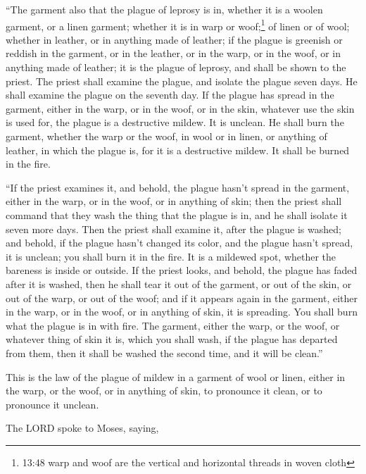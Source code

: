 \myverse{}“The garment also that the plague of leprosy is in, whether
it is a woolen garment, or a linen garment;
\myverse{}whether it is in warp or woof;\footnote{13:48 warp and woof are the vertical and horizontal threads in woven cloth} of linen or of
wool; whether in leather, or in anything made of leather;
\myverse{}if the plague is greenish or reddish in the garment, or in the leather, or
in the warp, or in the woof, or in anything made of leather; it is the plague of leprosy, and shall be
shown to the priest.
\myverse{}The priest shall examine the plague, and isolate the plague seven days.
\myverse{}He shall examine the plague on the seventh day. If the plague has spread
in the garment, either in the warp, or in the woof, or in the skin, whatever use the skin is used for,
the plague is a destructive mildew. It is unclean.
\myverse{}He shall burn the garment, whether the warp or the woof, in wool or in linen,
or anything of leather, in which the plague is, for it is a destructive mildew. It shall be burned in
the fire.


\myverse{}“If the priest examines it, and behold, the plague hasn’t spread
in the garment, either in the warp, or in the woof, or in anything of skin;
\myverse{}then the priest shall command that they wash the thing that the plague is
in, and he shall isolate it seven more days.
\myverse{}Then the priest shall examine it, after the plague is washed; and behold,
if the plague hasn’t changed its color, and the plague hasn’t spread, it is unclean; you shall burn it
in the fire. It is a mildewed spot, whether the bareness is inside or outside.
\myverse{}If the priest looks, and behold, the plague has faded after it is washed,
then he shall tear it out of the garment, or out of the skin, or out of the warp, or out of the woof;
\myverse{}and if it appears again in the garment, either in the warp, or in the woof,
or in anything of skin, it is spreading. You shall burn what the plague is in with fire.
\myverse{}The garment, either the warp, or the woof, or whatever thing of skin it is,
which you shall wash, if the plague has departed from them, then it shall be washed the second time, and
it will be clean.”


\myverse{}This is the law of the plague of mildew in a garment of wool
or linen, either in the warp, or the woof, or in anything of skin, to pronounce it clean, or to pronounce
it unclean.


\mychapter{} \myverse*{}The LORD spoke to Moses, saying,



